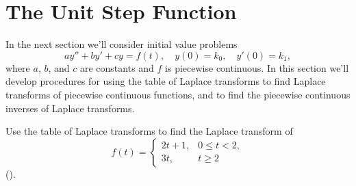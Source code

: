 \section{The Unit Step Function}\label{sec:unit_step_func}

In the next section we'll consider initial value problems
\[
ay''+by'+cy=f(t),\quad y(0)=k_0,\quad y'(0)=k_1,
\]
where $a$, $b$, and $c$ are constants and $f$ is  piecewise continuous.
 In this section we'll develop procedures for using the
table of Laplace transforms to find  Laplace transforms of
piecewise continuous functions, and to find the piecewise continuous
inverses of Laplace transforms.

\begin{example}\label{example:8.4.1}
 Use the table of Laplace transforms to find the Laplace
transform of
\begin{equation} \label{eq:8.4.1}
f(t)=\begin{cases}
2t+1,&0\le t<2,\\
 3t,&t\ge2
\end{cases}
\end{equation}
().
\end{example}




